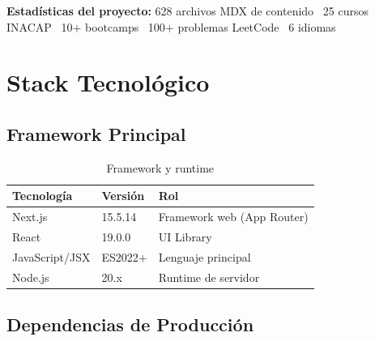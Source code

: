 \documentclass[12pt,a4paper]{article}
\begin{document}
\begin{mdframed}[style=infobox]
  \textbf{Estadísticas del proyecto:} 628 archivos MDX de contenido \textbullet\ 25 cursos INACAP \textbullet\ 10+ bootcamps \textbullet\ 100+ problemas LeetCode \textbullet\ 6 idiomas
\end{mdframed}

\section{Stack Tecnológico}

\subsection{Framework Principal}

\begin{table}[h]
\centering
\begin{tabular}{lll}
\toprule
\textbf{Tecnología} & \textbf{Versión} & \textbf{Rol} \\
\midrule
Next.js & 15.5.14 & Framework web (App Router) \\
React & 19.0.0 & UI Library \\
JavaScript/JSX & ES2022+ & Lenguaje principal \\
Node.js & 20.x & Runtime de servidor \\
\bottomrule
\end{tabular}
\caption{Framework y runtime}
\end{table}

\subsection{Dependencias de Producción}
\end{document}
